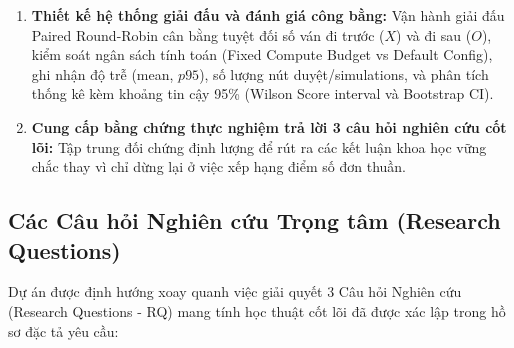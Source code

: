 \documentclass[a4paper,12pt]{report}
\begin{document}
\begin{enumerate}[leftmargin=1.5cm]
\begin{itemize}
    \end{itemize}
    \item \textbf{Thiết kế hệ thống giải đấu và đánh giá công bằng:} Vận hành giải đấu Paired Round-Robin cân bằng tuyệt đối số ván đi trước ($X$) và đi sau ($O$), kiểm soát ngân sách tính toán (Fixed Compute Budget vs Default Config), ghi nhận độ trễ (mean, $p95$), số lượng nút duyệt/simulations, và phân tích thống kê kèm khoảng tin cậy 95\% (Wilson Score interval và Bootstrap CI).
    \item \textbf{Cung cấp bằng chứng thực nghiệm trả lời 3 câu hỏi nghiên cứu cốt lõi:} Tập trung đối chứng định lượng để rút ra các kết luận khoa học vững chắc thay vì chỉ dừng lại ở việc xếp hạng điểm số đơn thuần.
\end{enumerate}

\subsection{Các Câu hỏi Nghiên cứu Trọng tâm (Research Questions)}
Dự án được định hướng xoay quanh việc giải quyết 3 Câu hỏi Nghiên cứu (Research Questions - RQ) mang tính học thuật cốt lõi đã được xác lập trong hồ sơ đặc tả yêu cầu:
\end{document}
